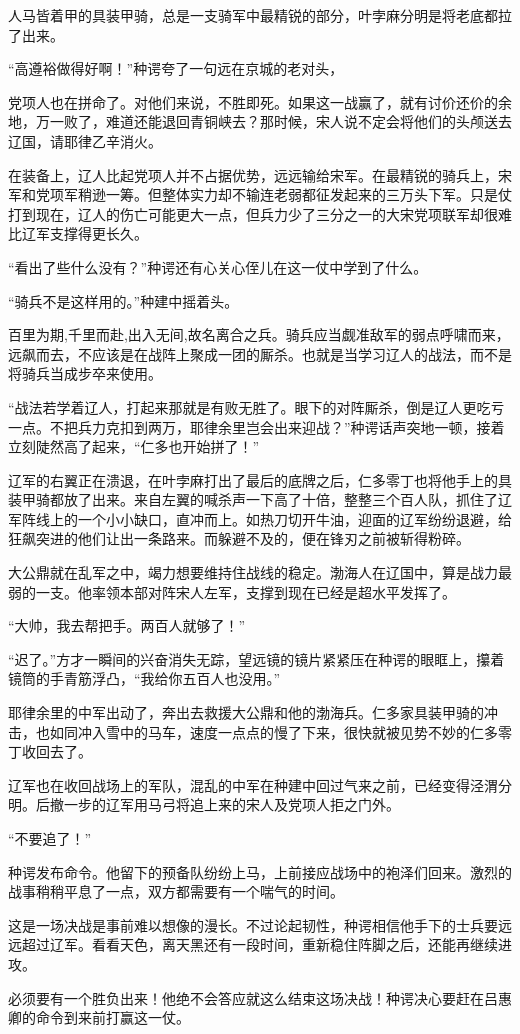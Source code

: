 人马皆着甲的具装甲骑，总是一支骑军中最精锐的部分，叶孛麻分明是将老底都拉了出来。

“高遵裕做得好啊！”种谔夸了一句远在京城的老对头，

党项人也在拼命了。对他们来说，不胜即死。如果这一战赢了，就有讨价还价的余地，万一败了，难道还能退回青铜峡去？那时候，宋人说不定会将他们的头颅送去辽国，请耶律乙辛消火。

在装备上，辽人比起党项人并不占据优势，远远输给宋军。在最精锐的骑兵上，宋军和党项军稍逊一筹。但整体实力却不输连老弱都征发起来的三万头下军。只是仗打到现在，辽人的伤亡可能更大一点，但兵力少了三分之一的大宋党项联军却很难比辽军支撑得更长久。

“看出了些什么没有？”种谔还有心关心侄儿在这一仗中学到了什么。

“骑兵不是这样用的。”种建中摇着头。

百里为期,千里而赴,出入无间,故名离合之兵。骑兵应当觑准敌军的弱点呼啸而来，远飙而去，不应该是在战阵上聚成一团的厮杀。也就是当学习辽人的战法，而不是将骑兵当成步卒来使用。

“战法若学着辽人，打起来那就是有败无胜了。眼下的对阵厮杀，倒是辽人更吃亏一点。不把兵力克扣到两万，耶律余里岂会出来迎战？”种谔话声突地一顿，接着立刻陡然高了起来，“仁多也开始拼了！”

辽军的右翼正在溃退，在叶孛麻打出了最后的底牌之后，仁多零丁也将他手上的具装甲骑都放了出来。来自左翼的喊杀声一下高了十倍，整整三个百人队，抓住了辽军阵线上的一个小小缺口，直冲而上。如热刀切开牛油，迎面的辽军纷纷退避，给狂飙突进的他们让出一条路来。而躲避不及的，便在锋刃之前被斩得粉碎。

大公鼎就在乱军之中，竭力想要维持住战线的稳定。渤海人在辽国中，算是战力最弱的一支。他率领本部对阵宋人左军，支撑到现在已经是超水平发挥了。

“大帅，我去帮把手。两百人就够了！”

“迟了。”方才一瞬间的兴奋消失无踪，望远镜的镜片紧紧压在种谔的眼眶上，攥着镜筒的手青筋浮凸，“我给你五百人也没用。”

耶律余里的中军出动了，奔出去救援大公鼎和他的渤海兵。仁多家具装甲骑的冲击，也如同冲入雪中的马车，速度一点点的慢了下来，很快就被见势不妙的仁多零丁收回去了。

辽军也在收回战场上的军队，混乱的中军在种建中回过气来之前，已经变得泾渭分明。后撤一步的辽军用马弓将追上来的宋人及党项人拒之门外。

“不要追了！”

种谔发布命令。他留下的预备队纷纷上马，上前接应战场中的袍泽们回来。激烈的战事稍稍平息了一点，双方都需要有一个喘气的时间。

这是一场决战是事前难以想像的漫长。不过论起韧性，种谔相信他手下的士兵要远远超过辽军。看看天色，离天黑还有一段时间，重新稳住阵脚之后，还能再继续进攻。

必须要有一个胜负出来！他绝不会答应就这么结束这场决战！种谔决心要赶在吕惠卿的命令到来前打赢这一仗。

